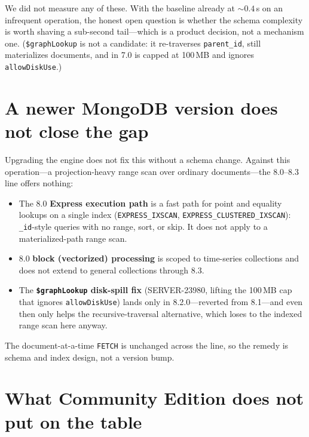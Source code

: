 \documentclass[11pt]{article}
\newcommand{\code}[1]{\texttt{#1}}
\begin{document}
We did not measure any of these. With the baseline already at ${\sim}0.4$\,s on an
infrequent operation, the honest open question is whether the schema complexity is
worth shaving a sub-second tail---which is a product decision, not a mechanism
one. (\code{\$graphLookup} is not a candidate: it re-traverses \code{parent\_id},
still materializes documents, and in 7.0 is capped at 100\,MB and ignores
\code{allowDiskUse}.)

\section{A newer MongoDB version does not close the gap}

Upgrading the engine does not fix this without a schema change. Against this
operation---a projection-heavy range scan over ordinary documents---the 8.0--8.3
line offers nothing:

\begin{itemize}\itemsep2pt
\item The 8.0 \textbf{Express execution path} is a fast path for point and
equality lookups on a single index (\code{EXPRESS\_IXSCAN},
\code{EXPRESS\_CLUSTERED\_IXSCAN}): \code{\_id}-style queries with no range, sort,
or skip. It does not apply to a materialized-path range scan.
\item 8.0 \textbf{block (vectorized) processing} is scoped to time-series
collections and does not extend to general collections through 8.3.
\item The \textbf{\code{\$graphLookup} disk-spill fix} (SERVER-23980, lifting the
100\,MB cap that ignores \code{allowDiskUse}) lands only in 8.2.0---reverted from
8.1---and even then only helps the recursive-traversal alternative, which loses to
the indexed range scan here anyway.
\end{itemize}

\noindent The document-at-a-time \code{FETCH} is unchanged across the line, so the
remedy is schema and index design, not a version bump.

\section{What Community Edition does not put on the table}
\end{document}
